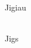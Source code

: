\begin{multicols}{2}
    \Huge{Jigiau}\\
    \vspace{1cm}\\
    \normalsize{
      \noindent 
      \blindtext
    }

    \newcolumn

    \Huge{Jigs}\\
    \vspace{1cm}\\
    \normalsize{
      \noindent
      \blindtext
    }

    \end{multicols}